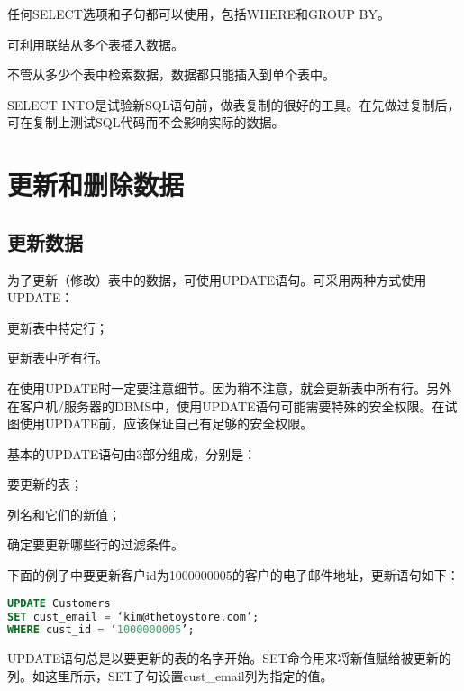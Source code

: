 \begin{compactitem}
\item 任何SELECT选项和子句都可以使用，包括WHERE和GROUP BY。
\item 可利用联结从多个表插入数据。
\item 不管从多少个表中检索数据，数据都只能插入到单个表中。
\end{compactitem}

SELECT INTO是试验新SQL语句前，做表复制的很好的工具。在先做过复制后，可在复制上测试SQL代码而不会影响实际的数据。


\section{更新和删除数据}


\subsection{更新数据}


为了更新（修改）表中的数据，可使用UPDATE语句。可采用两种方式使用UPDATE：

\begin{compactitem}
\item 更新表中特定行；
\item 更新表中所有行。
\end{compactitem}


在使用UPDATE时一定要注意细节。因为稍不注意，就会更新表中所有行。另外在客户机/服务器的DBMS中，使用UPDATE语句可能需要特殊的安全权限。在试图使用UPDATE前，应该保证自己有足够的安全权限。

基本的UPDATE语句由3部分组成，分别是：

\begin{compactenum}
\item 要更新的表；
\item 列名和它们的新值；
\item 确定要更新哪些行的过滤条件。
\end{compactenum}


下面的例子中要更新客户id为1000000005的客户的电子邮件地址，更新语句如下：

\begin{lstlisting}[language=SQL]
UPDATE Customers
SET cust_email = ‘kim@thetoystore.com’;
WHERE cust_id = ‘1000000005’;
\end{lstlisting}

UPDATE语句总是以要更新的表的名字开始。SET命令用来将新值赋给被更新的列。如这里所示，SET子句设置cust\_email列为指定的值。

